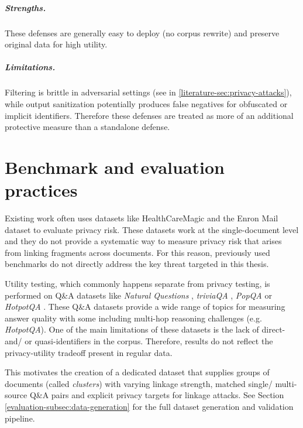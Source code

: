 \subparagraph{Strengths.} These defenses are generally easy to deploy (no corpus rewrite) and preserve original data for high utility. 

\subparagraph{Limitations.} Filtering is brittle in adversarial settings  (see in \ref{literature-sec:privacy-attacks}), while output sanitization potentially produces false negatives for obfuscated or implicit identifiers. Therefore these defenses are treated as more of an additional protective measure than a standalone defense.


\section{Benchmark and evaluation practices}
Existing work often uses datasets like HealthCareMagic and the Enron Mail dataset to evaluate privacy risk. These datasets work at the single-document level and they do not provide a systematic way to measure privacy risk that arises from linking fragments across documents. For this reason, previously used benchmarks do not directly address the key threat targeted in this thesis. 

Utility testing, which commonly happens separate from privacy testing, is performed on Q\&A datasets like \textit{Natural Questions} \cite{NQ}, \textit{triviaQA} \cite{TriviaQA}, \textit{PopQA} \cite{popQA} or \textit{HotpotQA} \cite{hotpotQA}. These Q\&A datasets provide a wide range of topics for measuring answer quality with some including multi-hop reasoning challenges (e.g. \textit{HotpotQA}). One of the main limitations of these datasets is the lack of direct- and/ or quasi-identifiers in the corpus. Therefore, results do not reflect the privacy-utility tradeoff present in regular data.

This motivates the creation of a dedicated dataset that supplies groups of documents (called \textit{clusters}) with varying linkage strength, matched single/ multi-source Q\&A pairs and explicit privacy targets for linkage attacks. See Section \ref{evaluation-subsec:data-generation} for the full dataset generation and validation pipeline.


